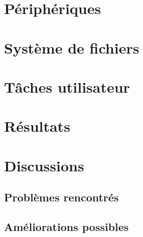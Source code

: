 \documentclass[a4paper, 12pt]{article}
\begin{document}
\newpage

\section{Périphériques}


\newpage

\section{Système de fichiers}


\newpage

\section{Tâches utilisateur}

\newpage

\section{Résultats}

\newpage

\section{Discussions}
\subsection{Problèmes rencontrés}


\subsection{Améliorations possibles}
\end{document}

